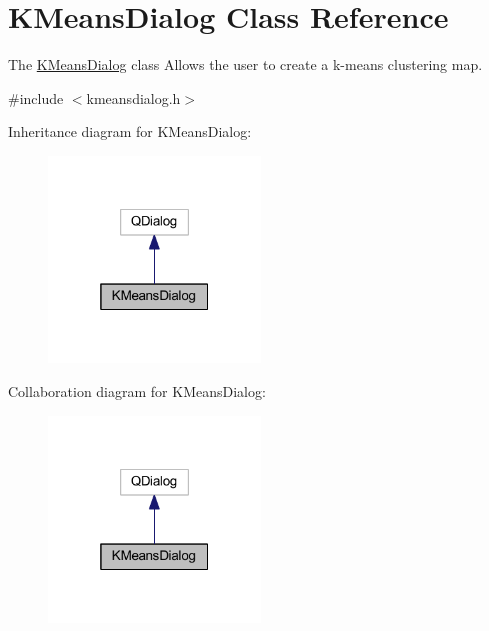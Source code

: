 \hypertarget{class_k_means_dialog}{\section{K\+Means\+Dialog Class Reference}
\label{class_k_means_dialog}
}


The \hyperlink{class_k_means_dialog}{K\+Means\+Dialog} class Allows the user to create a k-\/means clustering map.  




{\ttfamily \#include $<$kmeansdialog.\+h$>$}



Inheritance diagram for K\+Means\+Dialog\+:\nopagebreak
\begin{figure}[H]
\begin{center}
\leavevmode
\includegraphics[width=160pt]{class_k_means_dialog__inherit__graph}
\end{center}
\end{figure}


Collaboration diagram for K\+Means\+Dialog\+:\nopagebreak
\begin{figure}[H]
\begin{center}
\leavevmode
\includegraphics[width=160pt]{class_k_means_dialog__coll__graph}
\end{center}
\end{figure}
